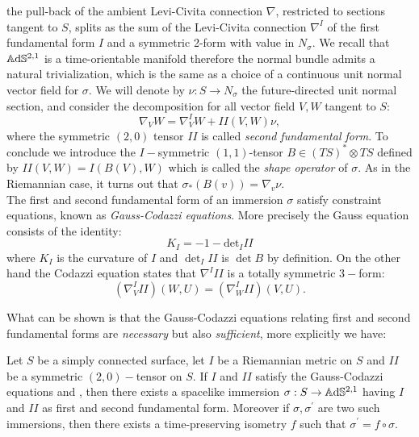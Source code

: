 the pull-back of the ambient Levi-Civita connection $\nabla$, restricted to sections tangent to $S$, splits as the sum of the Levi-Civita connection $\nabla^I$ of the first fundamental form $I$ and a symmetric 2-form with value in $N_\sigma$. We recall that $\mathbb{A}\mathrm{d}\mathbb{S}^{2,1}$ is a time-orientable manifold therefore the normal bundle admits a natural trivialization, which is the same as a choice of a continuous unit normal vector field for $\sigma.$ We will denote by $\nu:S\to N_\sigma$ the future-directed unit normal section, and consider the decomposition for all vector field $V,W$ tangent to $S$: 
\[
    \nabla_V W=\nabla^I_V W+II(V,W)\nu,
\]
where the symmetric $(2,0)$ tensor $II$ is called \textit{second fundamental form}. To conclude we introduce the $I-$symmetric $(1,1)$-tensor $B\in (TS)^*\otimes TS$ defined by $II(V,W)=I(B(V),W)$ which is called the \textit{shape operator} of $\sigma.$ As in the Riemannian case, it turns out that $\sigma_*(B(v))=\nabla_v\nu.$\\  
The first and second fundamental form of an immersion $\sigma$ satisfy constraint equations, known as \textit{Gauss-Codazzi equations}. More precisely the Gauss equation consists of the identity: 
\begin{equation}\label{Gauss}
    K_I=-1-\text{det}_I II
\end{equation}
where $K_I$ is the curvature of $I$ and $\det_I II$ is $\det B$ by definition. On the other hand the Codazzi equation states that $\nabla^III$ is a totally symmetric $3-$form:
\begin{equation}\label{Codazzi}
    (\nabla_V^{I}II)(W,U)=(\nabla_W^I II)(V,U).  
\end{equation}

What can be shown is that the Gauss-Codazzi equations relating first and second fundamental forms are \textit{necessary} but also \textit{sufficient}, more explicitly we have:

\begin{theorem}\label{immcondition}
    Let $S$ be a simply connected surface, let $I$ be a Riemannian metric on $S$ and $II$  be a symmetric $(2,0)-$tensor on $S$. If $I$ and $II$ satisfy the Gauss-Codazzi equations  and , then there exists a spacelike immersion $\sigma:S\to\mathbb{A}\mathrm{d}\mathbb{S}^{2,1}$ having $I$ and $II$ as first and second fundamental form. Moreover if $\sigma,\sigma^{\prime}$ are two such immersions, then there exists a time-preserving isometry $f$ such that $\sigma^{\prime} =f\circ\sigma$.  
\end{theorem}

